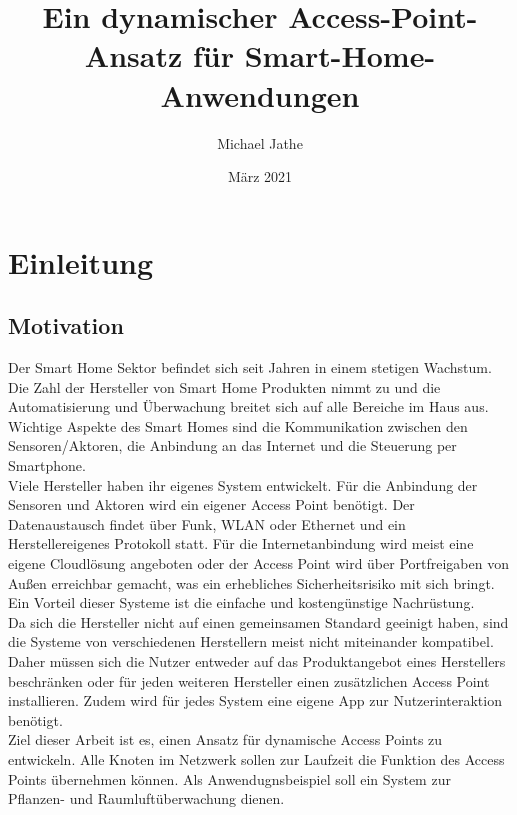 \documentclass{article}
\title{Ein dynamischer Access-Point-Ansatz für Smart-Home-Anwendungen}
\author{Michael Jathe}
\date{März 2021}
\begin{document}
\maketitle

\section{Einleitung}

\subsection{Motivation}

Der Smart Home Sektor befindet sich seit Jahren in
einem stetigen Wachstum. Die Zahl der Hersteller von
Smart Home Produkten nimmt zu und die Automatisierung
und Überwachung breitet sich auf alle Bereiche
im Haus aus.\\

Wichtige Aspekte des Smart Homes sind die Kommunikation
zwischen den Sensoren/Aktoren, die Anbindung an das
Internet und die Steuerung per Smartphone.\\

Viele Hersteller haben ihr eigenes System
entwickelt. Für die Anbindung der Sensoren und Aktoren
wird ein eigener Access Point benötigt. Der Datenaustausch
findet über Funk, WLAN oder Ethernet und ein Herstellereigenes
Protokoll statt. Für die Internetanbindung wird
meist eine eigene Cloudlösung angeboten oder der Access
Point wird über Portfreigaben von Außen erreichbar gemacht,
was ein erhebliches Sicherheitsrisiko mit sich bringt. Ein
Vorteil dieser Systeme ist die einfache und kostengünstige
Nachrüstung.\\

Da sich die Hersteller nicht auf einen gemeinsamen Standard
geeinigt haben, sind die Systeme von verschiedenen
Herstellern meist nicht miteinander kompatibel. Daher müssen
sich die Nutzer entweder auf das Produktangebot eines Herstellers
beschränken oder für jeden weiteren Hersteller einen
zusätzlichen Access Point installieren. Zudem wird für jedes System
eine eigene App zur Nutzerinteraktion benötigt.\\

Ziel dieser Arbeit ist es, einen Ansatz für dynamische Access Points zu entwickeln. Alle Knoten im Netzwerk sollen zur Laufzeit die Funktion des Access Points übernehmen können. Als Anwendugnsbeispiel soll ein System zur Pflanzen- und Raumluftüberwachung dienen. 
\end{document}
